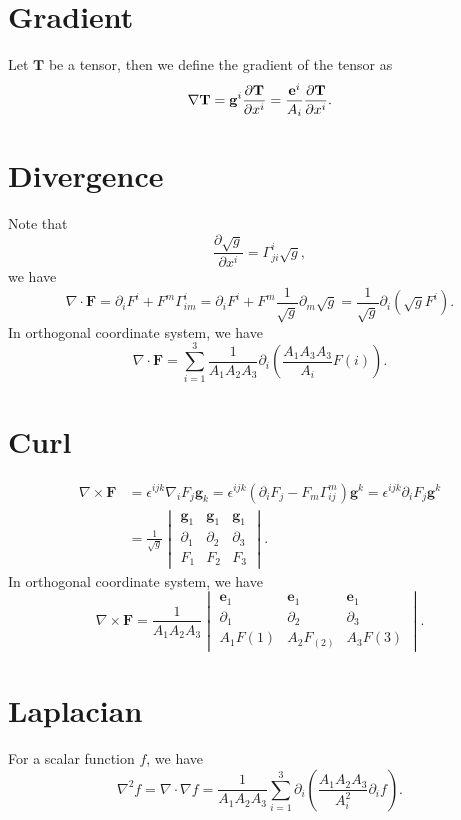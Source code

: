 \documentclass{article}
\theoremstyle{1}
\theoremstyle{2}
\newcommand{\pa}{\partial}
\begin{document}
\section{Gradient}
Let $\mathbf{T}$ be a tensor, then we define the gradient of the tensor as
\begin{equation}
    \nabla \mathbf{T}=\mathbf{g}^i\pdv{\mathbf{T}}{x^i}=\frac{\mathbf{e}^i}{A_i}\pdv{\mathbf{T}}{x^i}.
\end{equation}



\section{Divergence}
Note that 
\begin{equation}
    \frac{\pa \sqrt{g}}{\pa x^i}=\Gamma_{ji}^i\sqrt{g},
\end{equation}
we have 
\begin{equation}
    \nabla\cdot\mathbf{F}=\pa_i F^i+F^m\Gamma_{im}^i=\pa_i F^i+ F^m\frac{1}{\sqrt{g}}\pa _m\sqrt{g}=\frac{1}{\sqrt{g}}\pa_i\left(\sqrt{g}F^i\right).
\end{equation}
In orthogonal coordinate system, we have
\begin{equation}
    \nabla\cdot\mathbf{F}=\sum_{i=1}^3\frac{1}{A_1A_2A_3}\pa_i\left(\frac{A_1A_3A_3}{A_i}F(i)\right).
\end{equation}



\section{Curl}
\begin{align}
    \nabla\times \mathbf{F}&=\epsilon^{ijk}\nabla_i F_j\mathbf{g}_k=\epsilon^{ijk}\left(\pa_i F_j-F_m\Gamma_{ij}^m\right)\mathbf{g}^k=\epsilon^{ijk}\pa_iF_j\mathbf{g}^k\\
    &=\frac{1}{\sqrt{g}}\begin{vmatrix}
 \mathbf{g}_1  & \mathbf{g}_1 &\mathbf{g}_1 \\
 \partial _1 & \partial _2 &\partial _3 \\
 F_1 & F_2 &F_3
\end{vmatrix}.
\end{align}
In orthogonal coordinate system, we have
\begin{equation}
    \nabla\times \mathbf{F}=\frac{1}{A_1A_2A_3} \begin{vmatrix}
 \mathbf{e}_1  & \mathbf{e}_1 &\mathbf{e}_1 \\
 \partial _1 & \partial _2 &\partial _3 \\
 A_1F(1) & A_2F_(2) &A_3F(3)
\end{vmatrix}.
\end{equation}


\section{Laplacian}
For a scalar function $f$, we have
\begin{equation}
    \nabla^2f=\nabla\cdot\nabla f=\frac{1}{A_1A_2A_3}\sum_{i=1}^{3}\pa_i\left(\frac{A_1A_2A_3}{A_i^2}\pa_i f\right).
\end{equation}
\end{document}
